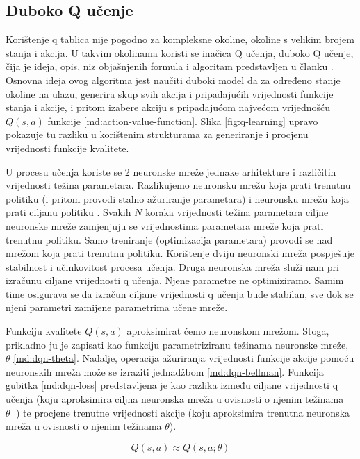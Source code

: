 \subsection{Duboko Q učenje}

Korištenje q tablica nije pogodno za kompleksne okoline, okoline s velikim brojem stanja i akcija. U takvim okolinama koristi se inačica Q učenja, duboko Q učenje, čija je ideja, opis, niz objašnjenih formula i algoritam predstavljen u članku \cite{DQL}. Osnovna ideja ovog algoritma jest naučiti duboki model da za određeno stanje okoline na ulazu, generira skup svih akcija i pripadajućih vrijednosti funkcije stanja i akcije, i pritom izabere akciju s pripadajućom najvećom vrijednošću $Q(s, a)$ funkcije \ref{md:action-value-function}. Slika \ref{fig:q-learning} upravo pokazuje tu razliku u korištenim strukturama za generiranje i procjenu vrijednosti funkcije kvalitete.

U procesu učenja koriste se 2 neuronske mreže jednake arhitekture i različitih vrijednosti težina parametara. Razlikujemo neuronsku mrežu koja prati trenutnu politiku (i pritom provodi stalno ažuriranje parametara)  i neuronsku mrežu koja prati ciljanu politiku . Svakih $N$ koraka vrijednosti težina parametara ciljne neuronske mreže zamjenjuju se vrijednostima parametara mreže koja prati trenutnu politiku. Samo treniranje (optimizacija parametara) provodi se nad mrežom koja prati trenutnu politiku. Korištenje dviju neuronski mreža pospješuje stabilnost i učinkovitost procesa učenja. Druga neuronska mreža služi nam pri izračunu ciljane vrijednosti q učenja. Njene parametre ne optimiziramo. Samim time osigurava se da izračun ciljane vrijednosti q učenja bude stabilan, sve dok se njeni parametri zamijene parametrima učene mreže.

Funkciju kvalitete $Q(s, a)$ aproksimirat ćemo neuronskom mrežom. Stoga, prikladno ju je zapisati kao funkciju parametriziranu težinama neuronske mreže, $\theta$ \ref{md:dqn-theta}. Nadalje, operacija ažuriranja vrijednosti funkcije akcije pomoću neuronskih mreža može se izraziti jednadžbom \ref{md:dqn-bellman}. Funkcija gubitka \ref{md:dqn-loss} predstavljena je kao razlika između ciljane vrijednosti q učenja (koju aproksimira ciljna neuronska mreža u ovisnosti o njenim težinama $\theta^-$) te procjene trenutne vrijednosti akcije (koju aproksimira trenutna neuronska mreža u ovisnosti o njenim težinama $\theta$).

\begin{equation}
    \label{md:dqn-theta}
    Q(s, a) \approx Q(s, a; \theta)
\end{equation}

